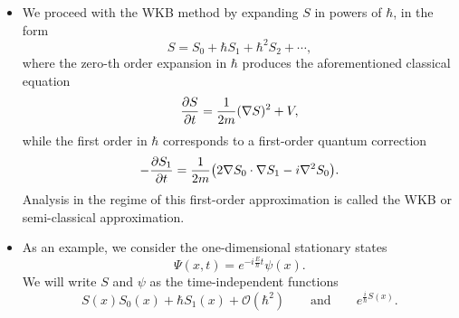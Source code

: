 \documentclass[11pt, a4paper]{article}
\renewcommand{\grad}{\nabla}
\renewcommand{\laplacian}{\nabla^{2}}
\begin{document}
\begin{itemize}
    \item We proceed with the WKB method by expanding $ S $ in powers of $ \hbar $, in the form
    \begin{equation*}
        S = S_{0} + \hbar S_{1} + \hbar^{2}S_{2} + \cdots,
    \end{equation*}
    where the zero-th order expansion in $ \hbar $ produces the aforementioned classical equation
    \begin{equation*}
        \pdv{S}{t} = \frac{1}{2m}(\grad S)^{2} + V,
    \end{equation*}
    while the first order in $ \hbar $ corresponds to a first-order quantum correction
    \begin{equation*}
        - \pdv{S_{1}}{t} = \frac{1}{2m} \big( 2 \grad S_{0} \cdot \grad S_{1} - i \laplacian S_{0} \big).
    \end{equation*}
    Analysis in the regime of this first-order approximation is called the WKB or semi-classical approximation.

    \item As an example, we consider the one-dimensional stationary states
    \begin{equation*}
        \Psi(x, t) = e^{-i \frac{E}{\hbar}t} \psi(x).
    \end{equation*}
    We will write $ S $ and $ \psi $ as the time-independent functions
    \begin{equation*}
        S(x) S_{0}(x) + \hbar S_{1}(x) + \mathcal{O}(\hbar^{2}) \qquad \text{and} \qquad e^{\frac{i}{\hbar}S(x)}.
    \end{equation*}
    

\end{itemize}
\end{document}
